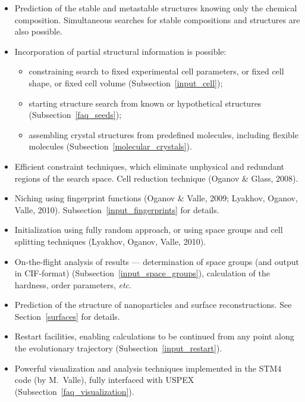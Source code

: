 \documentclass[12pt]{article}
\begin{document}
\begin{itemize}

\item Prediction of the stable and metastable structures knowing only the
chemical composition. Simultaneous searches for stable compositions and
structures are also possible.

\item Incorporation of partial structural information is possible:
\begin{itemize}
  \item constraining search to fixed experimental cell parameters, or fixed cell
  shape, or fixed cell volume (Subsection~\ref{input_cell});
  \item starting structure search from known or hypothetical structures
  (Subsection~\ref{faq_seeds});
  \item assembling crystal structures from predefined molecules, including
  flexible molecules (Subsection~\ref{molecular_crystals}).
\end{itemize}

\item Efficient constraint techniques, which eliminate unphysical and redundant
regions of the search space. Cell reduction technique (Oganov \& Glass, 2008).

\item Niching using fingerprint functions (Oganov \& Valle, 2009; Lyakhov,
Oganov, Valle, 2010). Subsection~\ref{input_fingerprints} for details.

\item Initialization using fully random approach, or using space groups and cell
splitting techniques (Lyakhov, Oganov, Valle, 2010).

\item On-the-flight analysis of results --- determination of space groups (and
output in CIF-format) (Subsection~\ref{input_space_groups}), calculation of the
hardness, order parameters, \emph{etc}.

\item Prediction of the structure of nanoparticles and surface reconstructions.
See Section~\ref{surfaces} for details.

\item Restart facilities, enabling calculations to be continued from any point
along the evolutionary trajectory (Subsection~\ref{input_restart}).

\item Powerful visualization and analysis techniques implemented in the STM4
code (by M.~Valle), fully interfaced with USPEX
(Subsection~\ref{faq_visualization}).


\end{itemize}
\end{document}
